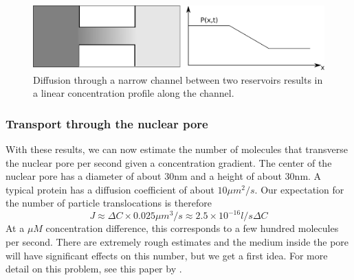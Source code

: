\begin{figure}[tb]
	\centering
	\includegraphics[width=\textwidth]{figures/diffusive_gradient.pdf}
	\caption{Diffusion through a narrow channel between two reservoirs results in a linear concentration profile along the channel.}
	\label{fig:diffusive_transport}
\end{figure}

\subsubsection*{Transport through the nuclear pore}
With these results, we can now estimate the number of molecules that transverse the nuclear pore per second given a concentration gradient.
The center of the nuclear pore has a diameter of about 30nm and a height of about 30nm.
A typical protein has a diffusion coefficient of about $10\mu m^2/s$.
Our expectation for the number of particle translocations is therefore
\begin{equation}
	J \approx \Delta C \times 0.025\mu m^3/s \approx 2.5\times 10^{-16}l/s \Delta C
\end{equation}
At a $\mu M$ concentration difference, this corresponds to a few hundred molecules per second.
There are extremely rough estimates and the medium inside the pore will have significant effects on this number, but we get a first idea.
For more detail on this problem, see this paper by \citet{ribbeck_kinetic_2001}.

